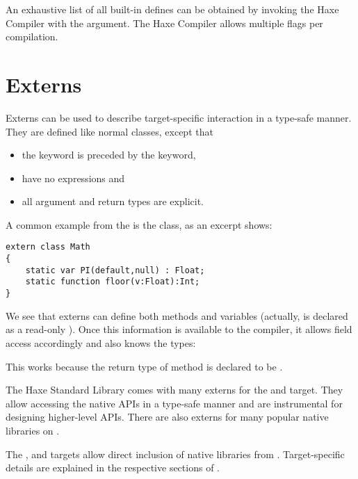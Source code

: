 An exhaustive list of all built-in defines can be obtained by invoking the Haxe Compiler with the  argument. The Haxe Compiler allows multiple  flags per compilation.


\section{Externs}
\label{lf-externs}

Externs can be used to describe target-specific interaction in a type-safe manner. They are defined like normal classes, except that

\begin{itemize}
	\item the  keyword is preceded by the  keyword,
	\item {} have no expressions and
	\item all argument and return types are explicit.
\end{itemize}

A common example from the  is the  class, as an excerpt shows:

\begin{lstlisting}
extern class Math
{
	static var PI(default,null) : Float;
	static function floor(v:Float):Int;
}
\end{lstlisting}

We see that externs can define both methods and variables (actually,  is declared as a read-only ). Once this information is available to the compiler, it allows field access accordingly and also knows the types:


This works because the return type of method  is declared to be .

The Haxe Standard Library comes with many externs for the  and  target. They allow accessing the native APIs in a type-safe manner and are instrumental for designing higher-level APIs. There are also externs for many popular native libraries on .

The ,  and  targets allow direct inclusion of native libraries from . Target-specific details are explained in the respective sections of .


